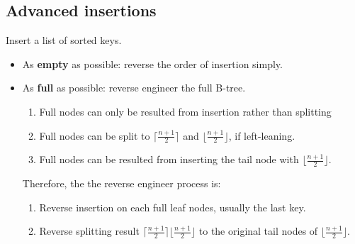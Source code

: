 \documentclass[a4paper]{report}
\begin{document}
\subsection{Advanced insertions}
Insert a list of sorted keys.
\begin{itemize}
\item As \textbf{empty} as possible: reverse the order of insertion simply.
\item As \textbf{full} as possible:
reverse engineer the full B-tree.
\begin{enumerate}
\item Full nodes can only be resulted from insertion rather than splitting
\item Full nodes can be split to $\lceil\frac{n+1}{2}\rceil$ and $\lfloor\frac{n+1}{2}\rfloor$, if left-leaning.
\item Full nodes can be resulted from inserting the tail node with $\lfloor\frac{n+1}{2}\rfloor$.
\end{enumerate}
Therefore, the the reverse engineer process is:
\begin{enumerate}
\item Reverse insertion on each full leaf nodes, usually the last key.
\item Reverse splitting result $\lceil\frac{n+1}{2}\rceil$$\lfloor\frac{n+1}{2}\rfloor$ to the original tail nodes of $\lfloor\frac{n+1}{2}\rfloor$.
\end{enumerate}
\end{itemize}
\end{document}
